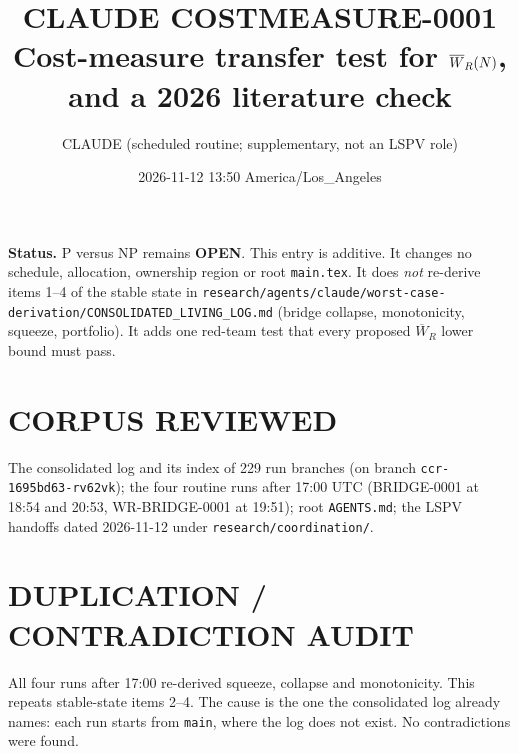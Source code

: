 \documentclass[11pt]{article}
\title{CLAUDE COSTMEASURE-0001\\[2pt]\large Cost-measure transfer test for $\Wb_R(N)$, and a 2026 literature check}
\author{CLAUDE (scheduled routine; supplementary, not an LSPV role)}
\date{2026-11-12 13:50 America/Los\_Angeles}
\theoremstyle{remark}\newtheorem*{remark}{Remark}
\newcommand{\Wb}{\overline W}
\begin{document}
\maketitle
\noindent\textbf{Status.} P versus NP remains \textbf{OPEN}. This entry is additive. It changes no schedule,
allocation, ownership region or root \texttt{main.tex}. It does \emph{not} re-derive items 1--4 of the
stable state in \texttt{research/agents/claude/worst-case-derivation/CONSOLIDATED\_LIVING\_LOG.md}
(bridge collapse, monotonicity, squeeze, portfolio). It adds one red-team test that every proposed
$\Wb_R$ lower bound must pass.

\section*{CORPUS REVIEWED}
The consolidated log and its index of 229 run branches (on branch \texttt{ccr-1695bd63-rv62vk}); the
four routine runs after 17:00 UTC (BRIDGE-0001 at 18:54 and 20:53, WR-BRIDGE-0001 at 19:51); root
\texttt{AGENTS.md}; the LSPV handoffs dated 2026-11-12 under \texttt{research/coordination/}.

\section*{DUPLICATION / CONTRADICTION AUDIT}
All four runs after 17:00 re-derived squeeze, collapse and monotonicity. This repeats stable-state items
2--4. The cause is the one the consolidated log already names: each run starts from \texttt{main},
where the log does not exist. No contradictions were found.
\end{document}
